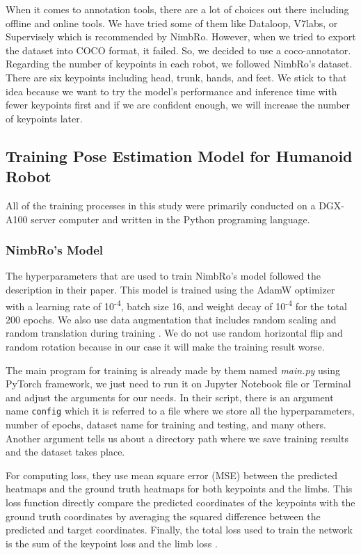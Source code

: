 When it comes to annotation tools, there are a lot of choices out there including offline and online tools. We have tried some of them like Dataloop, V7labs, or Supervisely which is recommended by NimbRo.
However, when we tried to export the dataset into COCO format, it failed. So, we decided to use a coco-annotator. Regarding the number of keypoints in each robot, we followed NimbRo's dataset.
There are six keypoints including head, trunk, hands, and feet. We stick to that idea because we want to try the model's performance and inference time with fewer keypoints first and if we are confident enough, we will increase the number of keypoints later.


\subsection{Training Pose Estimation Model for Humanoid Robot}
\label{subsec:training-robot}

All of the training processes in this study were primarily conducted on a DGX-A100 server computer and written in the Python programing language.

\subsubsection{NimbRo's Model}
\label{subsubsec:training-nimbro-model}

The hyperparameters that are used to train NimbRo's model followed the description in their paper.
This model is trained using the AdamW optimizer with a learning rate of 10\textsuperscript{-4},
batch size 16, and weight decay of 10\textsuperscript{-4} for the total 200 epochs.
We also use data augmentation that includes random scaling and random translation during training \citep{amini2021}.
We do not use random horizontal flip and random rotation because in our case it will make the training result worse.

The main program for training is already made by them named \emph{main.py} using PyTorch framework, we just need to run it on Jupyter Notebook file or Terminal and adjust the arguments for our needs.
In their script, there is an argument name \verb|config| which it is referred to a file where we store all the hyperparameters, number of epochs, dataset name for training and testing, and many others. 
Another argument tells us about a directory path where we save training results and the dataset takes place.

For computing loss, they use mean square error (MSE) between the predicted heatmaps and the ground truth heatmaps for both keypoints and the limbs.
This loss function directly compare the predicted coordinates of the keypoints with the ground truth coordinates by averaging the squared difference between the predicted and target coordinates.
Finally, the total loss used to train the network is the sum of the keypoint loss and the limb loss \citep{amini2021}.

